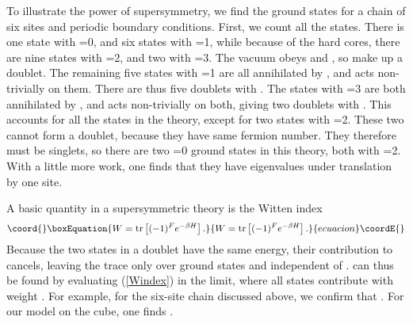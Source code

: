 \documentclass[a4paper,prl,aps,twocolumn]{revtex4}
\begin{document}
To illustrate the power of supersymmetry, we find the ground states
for a chain of six sites and periodic boundary conditions.  First, we
count all the states. There is one state \myHighlight{$|0\rangle$}\coordHE{} with \coordHE{}=0, and
six states \coordHE{} with \coordHE{}=1, while because of the
hard cores, there are nine states with \coordHE{}=2, and two with \coordHE{}=3. The
vacuum obeys \coordHE{} and \coordHE{}, so \coordHE{} make up a
doublet. The remaining five states with \coordHE{}=1 are all annihilated by
\coordHE{}, and \coordHE{} acts non-trivially on them. There are thus
five doublets with \coordHE{}. The states with \coordHE{}=3 are both
annihilated by \coordHE{}, and \coordHE{} acts non-trivially on both, giving two
doublets with \coordHE{}. This accounts for all the states in the
theory, except for two states with \coordHE{}=2.  These two cannot form a
doublet, because they have same fermion number.  They therefore must
be singlets, so there are two \coordHE{}=0 ground states in this theory, both
with \coordHE{}=2.  With a little more work, one
finds that they have eigenvalues \coordHE{} under translation
by one site. 

A basic quantity in a supersymmetric theory is the Witten index~\cite{Witten}  
\begin{equation}\coord{}\boxEquation{
W = \hbox{tr}\left[(-1)^F e^{-\beta H}\right]. \label{Windex}
}{
W = \hbox{tr}\left[(-1)^F e^{-\beta H}\right]. }{ecuacion}\coordE{}\end{equation}
Because the two states in a doublet have the same energy, their
contribution to \coordHE{} cancels, leaving the trace only over ground states
and \coordHE{} independent of \myHighlight{$\beta$}\coordHE{}.  \coordHE{} can thus be found by evaluating
(\ref{Windex}) in the \coordHE{} limit, where all states contribute
with weight \coordHE{}.  For example, for the six-site chain discussed
above, we confirm that \coordHE{}. For our model on the cube, one
finds \coordHE{}.
\end{document}
